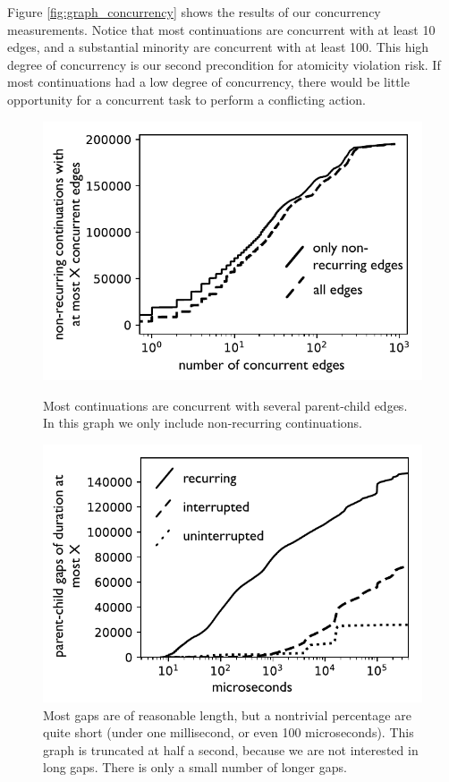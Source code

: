 \documentclass[acmsmall,anonymous,review]{acmart}\settopmatter{printfolios=true,printccs=false,printacmref=false}
\begin{document}
Figure \ref{fig:graph_concurrency} shows the results of our concurrency measurements.
Notice that most continuations are concurrent with at least 10 edges, and a substantial minority are concurrent with at least 100.
This high degree of concurrency is our second precondition for atomicity violation risk.
If most continuations had a low degree of concurrency, there would be little opportunity for a concurrent task to perform a conflicting action.

\begin{figure}
    \centering
    \begin{minipage}[t]{0.47\textwidth}
        \centering
        \includegraphics[width=1.0\textwidth]{Graphs/concurrency_bw}
        \caption{Most continuations are concurrent with several parent-child edges.
        In this graph we only include non-recurring continuations.}
        \label{fig:graph_concurrency}
    \end{minipage}\hfill
    \begin{minipage}[t]{0.47\textwidth}
        \centering
        \includegraphics[width=1.0\textwidth]{Graphs/gaps_bw}
        \caption{Most gaps are of reasonable length, but a nontrivial percentage are quite short (under one millisecond, or even 100 microseconds).
  This graph is truncated at half a second, because we are not interested in long gaps.
  There is only a small number of longer gaps.}
        \label{fig:graph_gaps}
    \end{minipage}
\end{figure}
\end{document}
